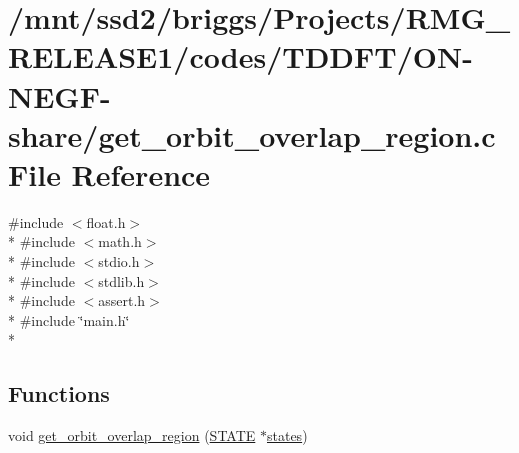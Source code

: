 \hypertarget{_t_d_d_f_t_2_o_n-_n_e_g_f-share_2get__orbit__overlap__region_8c}{\section{/mnt/ssd2/briggs/\-Projects/\-R\-M\-G\-\_\-\-R\-E\-L\-E\-A\-S\-E1/codes/\-T\-D\-D\-F\-T/\-O\-N-\/\-N\-E\-G\-F-\/share/get\-\_\-orbit\-\_\-overlap\-\_\-region.c File Reference}
\label{_t_d_d_f_t_2_o_n-_n_e_g_f-share_2get__orbit__overlap__region_8c}
}
{\ttfamily \#include $<$float.\-h$>$}\\*
{\ttfamily \#include $<$math.\-h$>$}\\*
{\ttfamily \#include $<$stdio.\-h$>$}\\*
{\ttfamily \#include $<$stdlib.\-h$>$}\\*
{\ttfamily \#include $<$assert.\-h$>$}\\*
{\ttfamily \#include \char`\"{}main.\-h\char`\"{}}\\*
\subsection*{Functions}
\begin{DoxyCompactItemize}
\item 
void \hyperlink{_t_d_d_f_t_2_o_n-_n_e_g_f-share_2get__orbit__overlap__region_8c_a5051cd09ff4c6830f7da4db5b063409e}{get\-\_\-orbit\-\_\-overlap\-\_\-region} (\hyperlink{struct_s_t_a_t_e}{S\-T\-A\-T\-E} $\ast$\hyperlink{md_8h_a286ebf6b996d2b1827eb9a889dfc83d7}{states})
\end{DoxyCompactItemize}


